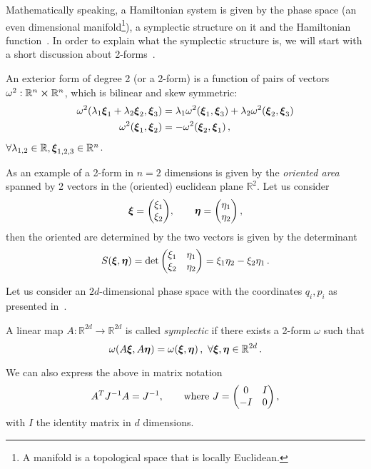 \documentclass[12pt, class=report, crop=false]{standalone}
\begin{document}
Mathematically speaking, a Hamiltonian system is given by the phase space (an
even dimensional manifold\footnote{A manifold is a topological space that is locally Euclidean.}),
a symplectic structure on it and the Hamiltonian
function~\autocite[160]{arnold_mathematicalmethods_1989}.
In order to explain what the symplectic structure is, we will start with a short
discussion about 2-forms~\autocite[164]{arnold_mathematicalmethods_1989}.

\begin{definition*}
  An exterior form of degree 2 (or a 2-form) is a function of pairs of vectors
  \(\omega^2: \mathbb{R}^n \cp \mathbb{R}^n\), which is bilinear and skew symmetric:
  \begin{align*}
  \omega^2(\lambda_1 \vb*{\xi}_1 + \lambda_2 \vb*{\xi}_2, \vb*{\xi}_3) &=
  \lambda_1 \omega^2(\vb*{\xi}_1, \vb*{\xi}_3) + \lambda_2 \omega^2(\vb*{\xi}_2, \vb*{\xi}_3) \\
  \omega^2(\vb*{\xi}_1,\vb*{\xi}_2) &= -\omega^2(\vb*{\xi}_2, \vb*{\xi}_1)\,,
  \end{align*}
  \(\forall \lambda_{1,2} \in \mathbb{R}, \vb*{\xi}_{1,2,3} \in \mathbb{R}^n\).
\end{definition*}

As an example of a 2-form in \(n=2\) dimensions is given by the \emph{oriented area} spanned by 2 vectors
in the (oriented) euclidean plane \(\mathbb{R}^2\).
Let us consider
\[
\vb*{\xi} = \mqty(\xi_1 \\ \xi_2), \qquad
\vb*{\eta} = \mqty(\eta_1 \\ \eta_2)\,,
\]
then the oriented are determined by the two vectors is given by
the determinant~\autocite{golomb_proofwords_1985}
\[
S(\vb*{\xi},\vb*{\eta}) = \det\mqty(\xi_1 & \eta_1 \\ \xi_2 & \eta_2)
= \xi_1 \eta_2 - \xi_2 \eta_1\,.
\]

Let us consider an \(2d\)-dimensional phase space with the coordinates \(q_i,p_i\)
as presented in~\textcite[183]{leimkuhler_simulatinghamiltonian_2004}.

\begin{definition}
  A linear map \(A: \mathbb{R}^{2d} \to \mathbb{R}^{2d}\) is called
  \emph{symplectic} if there exists a 2-form \(\omega\)
  such that
  \[
  \omega(A\vb*{\xi}, A\vb*{\eta}) = \omega(\vb*{\xi},\vb*{\eta})\,,\
  \forall \vb*{\xi}, \vb*{\eta} \in \mathbb{R}^{2d}\,.
  \]
\end{definition}

We can also express the above in matrix notation
\[
A^T J^{-1} A = J^{-1},\qquad \text{where} \ J = \mqty(0 & I \\ -I & 0)\,,
\]
with \(I\) the identity matrix in \(d\) dimensions.
\end{document}
